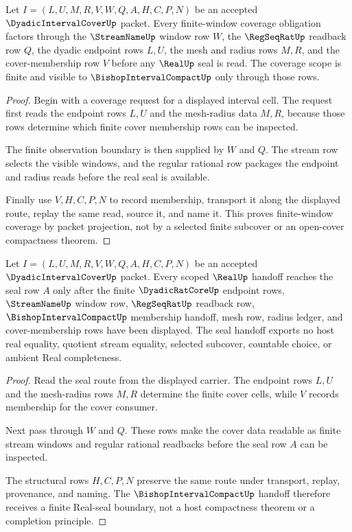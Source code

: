 \begin{theorem}
\label{thm:dyadicintervalcover-window-coverage-scope}
Let $I=(L,U,M,R,V,W,Q,A,H,C,P,N)$ be an accepted $\DyadicIntervalCoverUp$ packet. Every finite-window coverage obligation factors through the $\StreamNameUp$ window row $W$, the $\RegSeqRatUp$ readback row $Q$, the dyadic endpoint rows $L,U$, the mesh and radius rows $M,R$, and the cover-membership row $V$ before any $\RealUp$ seal is read. The coverage scope is finite and visible to $\BishopIntervalCompactUp$ only through those rows.
\end{theorem}
\begin{proof}
Begin with a coverage request for a displayed interval cell. The request first reads the endpoint rows $L,U$ and the mesh-radius data $M,R$, because those rows determine which finite cover membership rows can be inspected.

The finite observation boundary is then supplied by $W$ and $Q$. The stream row selects the visible windows, and the regular rational row packages the endpoint and radius reads before the real seal is available.

Finally use $V,H,C,P,N$ to record membership, transport it along the displayed route, replay the same read, source it, and name it. This proves finite-window coverage by packet projection, not by a selected finite subcover or an open-cover compactness theorem.
\end{proof}

\begin{theorem}
\label{thm:dyadicintervalcover-real-seal-scope}
Let $I=(L,U,M,R,V,W,Q,A,H,C,P,N)$ be an accepted $\DyadicIntervalCoverUp$ packet. Every scoped $\RealUp$ handoff reaches the seal row $A$ only after the finite $\DyadicRatCoreUp$ endpoint rows, $\StreamNameUp$ window row, $\RegSeqRatUp$ readback row, $\BishopIntervalCompactUp$ membership handoff, mesh row, radius ledger, and cover-membership rows have been displayed. The seal handoff exports no host real equality, quotient stream equality, selected subcover, countable choice, or ambient Real completeness.
\end{theorem}
\begin{proof}
Read the seal route from the displayed carrier. The endpoint rows $L,U$ and the mesh-radius rows $M,R$ determine the finite cover cells, while $V$ records membership for the cover consumer.

Next pass through $W$ and $Q$. These rows make the cover data readable as finite stream windows and regular rational readbacks before the seal row $A$ can be inspected.

The structural rows $H,C,P,N$ preserve the same route under transport, replay, provenance, and naming. The $\BishopIntervalCompactUp$ handoff therefore receives a finite Real-seal boundary, not a host compactness theorem or a completion principle.
\end{proof}

